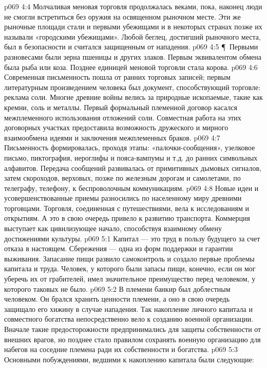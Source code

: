 \vs p069 4:4 Молчаливая меновая торговля продолжалась веками, пока, наконец люди не смогли встретиться без оружия на освященном рыночном месте. Эти же рыночные площади стали и первыми убежищами и в некоторых странах позже их называли «городскими убежищами». Любой беглец, достигший рыночного места, был в безопасности и считался защищенным от нападения.
\vs p069 4:5 \P\ Первыми разновесами были зерна пшеницы и других злаков. Первым эквивалентом обмена была рыба или коза. Позднее единицей меновой торговли стала корова.
\vs p069 4:6 Современная письменность пошла от ранних торговых записей; первым литературным произведением человека был документ, способствующий торговле: реклама соли. Многие древние войны велись за природные ископаемые, такие как кремни, соль и металлы. Первый формальный племенной договор касался межплеменного использования отложений соли. Совместная работа на этих договорных участках предоставила возможность дружеского и мирного взаимообмена идеями и заключения межплеменных браков.
\vs p069 4:7 Письменность формировалась, проходя этапы: «палочки\hyp{}сообщения», узелковое письмо, пиктография, иероглифы и пояса\hyp{}вампумы и т.д. до ранних символьных алфавитов. Передача сообщений развивалась от примитивных дымовых сигналов, затем скороходов, верховых, позже по железным дорогам и самолетами, по телеграфу, телефону, к беспроволочным коммуникациям.
\vs p069 4:8 Новые идеи и усовершенствованные приемы разносились по населенному миру древними торговцами. Торговля, соединенная с путешествиями, вела к исследованиям и открытиям. А это в свою очередь привело к развитию транспорта. Коммерция выступает как цивилизующее начало, способствуя взаимному обмену достижениями культуры.
\vs p069 5:1 Капитал --- это труд в пользу будущего за счет отказа в настоящем. Сбережения --- одна из форм поддержки и гарантии выживания. Запасание пищи развило самоконтроль и создало первые проблемы капитала и труда. Человек, у которого были запасы пищи, конечно, если он мог уберечь их от грабителей, имел значительное преимущество перед человеком, у которого таковых не было.
\vs p069 5:2 В племени банкир был доблестным человеком. Он брался хранить ценности племени, а оно в свою очередь защищало его хижину в случае нападения. Так накопление личного капитала и совместного богатства непосредственно вело к созданию военной организации. Вначале такие предосторожности предпринимались для защиты собственности от внешних врагов, но позднее стало правилом сохранять военную организацию для набегов на соседние племена ради их собственности и богатства.
\vs p069 5:3 Основными побуждениями, ведшими к накоплению капитала были следующие:
